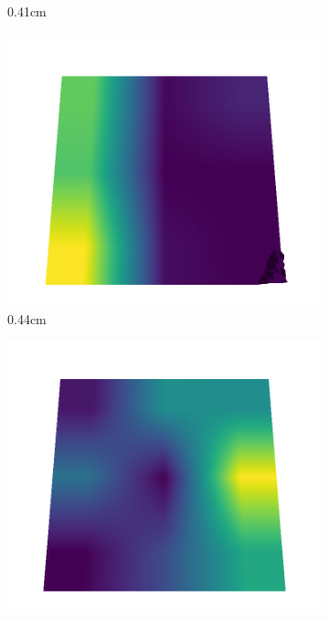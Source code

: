 \documentclass[../document.tex]{subfiles}
\begin{document}
\begin{figure}[H]
\begin{subfigure}[b]{0.192\linewidth}
    \caption{0.41cm}
    \label{fig : quarry-best-6}
    \end{subfigure}
    \begin{subfigure}[b]{0.192\linewidth}
    \includegraphics[width=\linewidth]{../img/5/quarry/best/44-patch-3d-majavi-colormap-60.png}
    \caption{0.44cm}
    \label{fig : quarry-best-7}
    \end{subfigure}
    \begin{subfigure}[b]{0.192\linewidth}
    \includegraphics[width=\linewidth]{../img/5/quarry/best/46-patch-3d-majavi-colormap-70.png}

\end{subfigure}
\end{figure}
\end{document}
